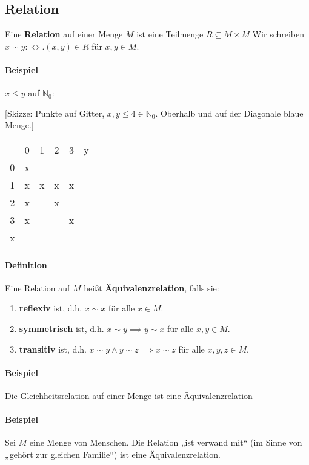 \documentclass[14pt,a4paper]{article}
\begin{document}
		\subsection{Relation}
			Eine \textbf{Relation} auf einer Menge $M$ ist eine Teilmenge $ R \subseteq M \times M $
			Wir schreiben $ x \sim y :\Leftrightarrow. (x,y) \in R$ für $x,y \in M$.

			\paragraph{Beispiel} $ x \leq y $ auf $ \mathbb{N}_0$:

				[Skizze: Punkte auf Gitter, $x,y \leq 4 \in \mathbb{N}_0$. Oberhalb und auf der Diagonale blaue Menge.]

				\begin{tabular}{ c | c | c | c | c   c }
					  & 0 & 1 & 2 & 3 & y \\
					0 & x &   &   &   &   \\
					1 & x & x & x & x &   \\
					2 & x &   & x &   &   \\
					3 & x &   &   & x &   \\
					x &   &   &   &   &   \\
				\end{tabular}
			\paragraph{Definition}
				Eine Relation auf $M$ heißt \textbf{Äquivalenzrelation}, falls sie:
				\begin{enumerate}
					\item \textbf{reflexiv} ist, d.h. $ x \sim x $ für alle $ x \in M$.
					\item \textbf{symmetrisch} ist, d.h. $x \sim y \implies y \sim x $ für alle $ x,y \in M $.
					\item \textbf{transitiv} ist, d.h. $ x \sim y \land y \sim z \implies x \sim z$ für alle $x,y,z \in M$.
				\end{enumerate}
			\paragraph{Beispiel}
				Die Gleichheitsrelation auf einer Menge ist eine Äquivalenzrelation
			\paragraph{Beispiel}
				Sei $M$ eine Menge von Menschen. Die Relation „ist verwand mit“ (im Sinne von „gehört zur gleichen Familie“) ist eine Äquivalenzrelation.
\end{document}
